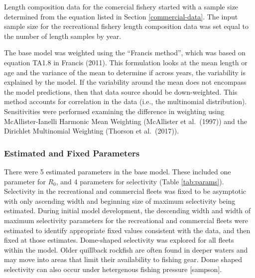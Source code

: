 \documentclass[11pt,
  english,
  a4paper,
]{article}
\begin{document}

Length composition data for the comercial fishery started with a sample size determined from the equation listed in Section \ref{commercial-data}. The input sample size for the recreational fishery length composition data was set equal to the number of length samples by year.

\leavevmode\tagmcend\tagstructend\par


The base model was weighted using the ``Francis method'', which was based on equation TA1.8 in Francis {(2011)\leavevmode\tagmcend\tagstructend}. This formulation looks at the mean length or age and the variance of the mean to determine if across years, the variability is explained by the model. If the variability around the mean does not encompass the model predictions, then that data source should be down-weighted. This method accounts for correlation in the data (i.e., the multinomial distribution). Sensitivities were performed examining the difference in weighting using McAllister-Ianelli Harmonic Mean Weighting (McAllister et al.~{(1997)\leavevmode\tagmcend\tagstructend}) and the Dirichlet Multinomial Weighting (Thorson et al.~{(2017)\leavevmode\tagmcend\tagstructend}).

\leavevmode\tagmcend\tagstructend\par


\hypertarget{estimated-and-fixed-parameters}{%
\subsubsection{Estimated and Fixed Parameters}\label{estimated-and-fixed-parameters}}

\leavevmode\tagmcend\tagstructend


There were 5 estimated parameters in the base model. These included one parameter for {\(R_0\)\leavevmode\tagmcend\tagstructend}, and 4 parameters for selectivity (Table \ref{tab:params}). Selectivity in the recreational and commercial fleets was fixed to be asymptotic with only ascending width and beginning size of maximum selectivity being estimated. During initial model development, the descending width and width of maximum selectivity parameters for the recreational and commercial fleets were estimated to identify appropriate fixed values consistent with the data, and then fixed at those estimates. Dome-shaped selectivity was explored for all fleets within the model. Older quillback rockfish are often found in deeper waters and may move into areas that limit their availability to fishing gear. Dome shaped selectivity can also occur under hetergenous fishing pressure {[}sampson{]}.
\end{document}
